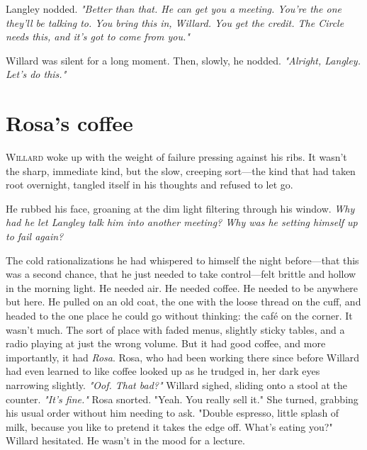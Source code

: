 Langley nodded. \textit{"Better than that. He can get you a meeting. You’re the one they’ll be talking to. You bring this in, Willard. You get the credit. The Circle needs this, and it’s got to come from you."}

Willard was silent for a long moment. Then, slowly, he nodded. \textit{"Alright, Langley. Let’s do this."}




\newpage
\section*{Rosa's coffee}

\lettrine{W}{illard} woke up with the weight of failure pressing against his ribs. It wasn’t the sharp, immediate kind, but the slow, creeping sort—the kind that had taken root overnight, tangled itself in his thoughts and refused to let go. 

He rubbed his face, groaning at the dim light filtering through his window. \textit{Why had he let Langley talk him into another meeting? Why was he setting himself up to fail again?}

The cold rationalizations he had whispered to himself the night before—that this was a second chance, that he just needed to take control—felt brittle and hollow in the morning light. He needed air. He needed coffee. He needed to be anywhere but here. He pulled on an old coat, the one with the loose thread on the cuff, and headed to the one place he could go without thinking: the café on the corner. 
\smallskip
It wasn’t much. The sort of place with faded menus, slightly sticky tables, and a radio playing at just the wrong volume. But it had good coffee, and more importantly, it had \textit{Rosa}.
\smallskip
Rosa, who had been working there since before Willard had even learned to like coffee looked up as he trudged in, her dark eyes narrowing slightly. \textit{"Oof. That bad?"}
\smallskip
Willard sighed, sliding onto a stool at the counter. \textit{"It’s fine."}
\smallskip
Rosa snorted. "Yeah. You really sell it." She turned, grabbing his usual order without him needing to ask. "Double espresso, little splash of milk, because you like to pretend it takes the edge off. What’s eating you?"
\smallskip
Willard hesitated. He wasn’t in the mood for a lecture. 

